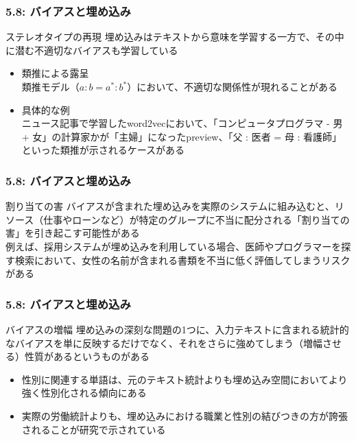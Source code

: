 \documentclass[unicode,11pt]{beamer} %
\begin{document}
\begin{frame}
    \frametitle{5.8: バイアスと埋め込み}
    \begin{alertblock}{ステレオタイプの再現}
        埋め込みはテキストから意味を学習する一方で、その中に潜む不適切なバイアスも学習している
        \begin{itemize}
            \item 類推による露呈\\類推モデル（$a : b = a^* : b^*$）において、不適切な関係性が現れることがある
            \item 具体的な例\\ニュース記事で学習したword2vecにおいて、「コンピュータプログラマ - 男 + 女」の計算家かが「主婦」になったpreview、「父 : 医者 = 母 : 看護師」といった類推が示されるケースがある
        \end{itemize}
    \end{alertblock}
\end{frame}

\begin{frame}
    \frametitle{5.8: バイアスと埋め込み}
    \begin{alertblock}{割り当ての害}
        バイアスが含まれた埋め込みを実際のシステムに組み込むと、リソース（仕事やローンなど）が特定のグループに不当に配分される「割り当ての害」を引き起こす可能性がある
        \\例えば、採用システムが埋め込みを利用している場合、医師やプログラマーを探す検索において、女性の名前が含まれる書類を不当に低く評価してしまうリスクがある
    \end{alertblock}
\end{frame}

\begin{frame}
    \frametitle{5.8: バイアスと埋め込み}
    \begin{alertblock}{バイアスの増幅}
        埋め込みの深刻な問題の1つに、入力テキストに含まれる統計的なバイアスを単に反映するだけでなく、それをさらに強めてしまう（増幅させる）性質があるというものがある
        \begin{itemize}
            \item 性別に関連する単語は、元のテキスト統計よりも埋め込み空間においてより強く性別化される傾向にある
            \item 実際の労働統計よりも、埋め込みにおける職業と性別の結びつきの方が誇張されることが研究で示されている
        \end{itemize}
    \end{alertblock}
\end{frame}
\end{document}
